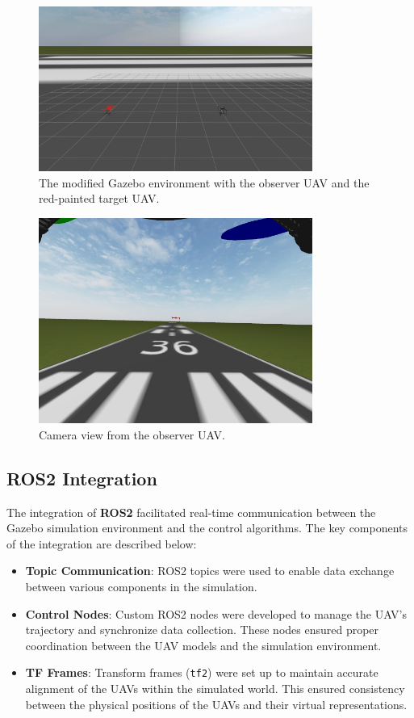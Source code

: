\begin{figure}[H]
    \centering
    \includegraphics[width=0.8\textwidth]{Imgs/gazebo.png}
    \caption{The modified Gazebo environment with the observer UAV and the red-painted target UAV.}
    \label{fig:gazebo_world}
\end{figure}

\begin{figure}[H]
    \centering
    \includegraphics[width=0.8\textwidth]{Imgs/observer_camera.jpg}
    \caption{Camera view from the observer UAV.}
    \label{fig:observer_camera}
\end{figure}
\subsection{ROS2 Integration}

The integration of \textbf{ROS2} facilitated real-time communication between the Gazebo simulation environment and the control algorithms. The key components of the integration are described below:

\begin{itemize}
    \item \textbf{Topic Communication}: ROS2 topics were used to enable data exchange between various components in the simulation. 
    \item \textbf{Control Nodes}: Custom ROS2 nodes were developed to manage the UAV’s trajectory and synchronize data collection. These nodes ensured proper coordination between the UAV models and the simulation environment.
    \item \textbf{TF Frames}: Transform frames (\texttt{tf2}) were set up to maintain accurate alignment of the UAVs within the simulated world. This ensured consistency between the physical positions of the UAVs and their virtual representations.
\end{itemize}

